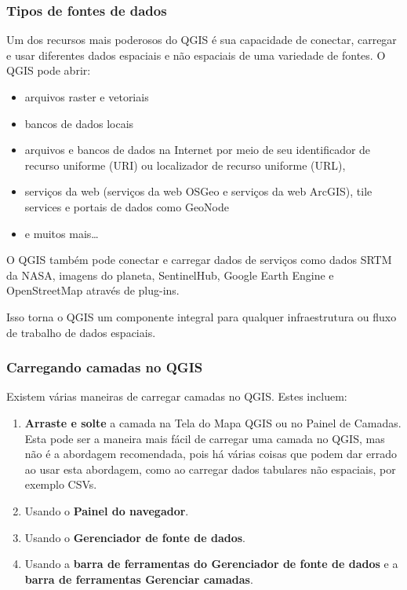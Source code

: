 \documentclass[
]{book}
\providecommand{\tightlist}{%
  \setlength{\itemsep}{0pt}\setlength{\parskip}{0pt}}
\begin{document}
\hypertarget{tipos-de-fontes-de-dados}{%
\subsubsection{\texorpdfstring{\textbf{Tipos de fontes de dados}}{Tipos de fontes de dados}}\label{tipos-de-fontes-de-dados}}

Um dos recursos mais poderosos do QGIS é sua capacidade de conectar, carregar e usar diferentes dados espaciais e não espaciais de uma variedade de fontes. O QGIS pode abrir:

\begin{itemize}
\tightlist
\item
  arquivos raster e vetoriais
\item
  bancos de dados locais
\item
  arquivos e bancos de dados na Internet por meio de seu identificador de recurso uniforme (URI) ou localizador de recurso uniforme (URL),
\item
  serviços da web (serviços da web OSGeo e serviços da web ArcGIS), tile services e portais de dados como GeoNode
\item
  e muitos mais\ldots{}
\end{itemize}

O QGIS também pode conectar e carregar dados de serviços como dados SRTM da NASA, imagens do planeta, SentinelHub, Google Earth Engine e OpenStreetMap através de plug-ins.

Isso torna o QGIS um componente integral para qualquer infraestrutura ou fluxo de trabalho de dados espaciais.

\hypertarget{carregando-camadas-no-qgis}{%
\subsubsection{\texorpdfstring{\textbf{Carregando camadas no QGIS}}{Carregando camadas no QGIS}}\label{carregando-camadas-no-qgis}}

Existem várias maneiras de carregar camadas no QGIS. Estes incluem:

\begin{enumerate}
\def\labelenumi{\arabic{enumi}.}
\tightlist
\item
  \textbf{Arraste e solte} a camada na Tela do Mapa QGIS ou no Painel de Camadas. Esta pode ser a maneira mais fácil de carregar uma camada no QGIS, mas não é a abordagem recomendada, pois há várias coisas que podem dar errado ao usar esta abordagem, como ao carregar dados tabulares não espaciais, por exemplo CSVs.
\item
  Usando o \textbf{Painel do navegador}.
\item
  Usando o \textbf{Gerenciador de fonte de dados}.
\item
  Usando a \textbf{barra de ferramentas do Gerenciador de fonte de dados} e a \textbf{barra de ferramentas Gerenciar camadas}.
\end{enumerate}
\end{document}
